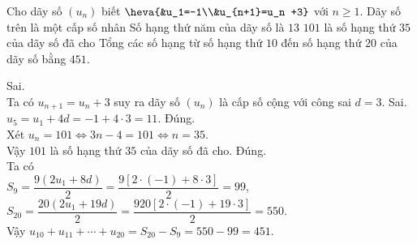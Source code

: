 \begin{ex}%
Cho dãy số $(u_n)$ biết $\heva{&u_1=-1\\&u_{n+1}=u_n +3}$ với $n \ge 1$.
	\choiceTF
	{Dãy số trên là một cấp số nhân}
	{Số hạng thứ năm của dãy số là $13$}
	{\True $101$ là số hạng thứ $35$ của dãy số đã cho}
	{\True Tổng các số hạng từ số hạng thứ $10$ đến số hạng thứ $20$ của dãy số bằng $451$.}
	\loigiai
	{
		\begin{itemchoice}
			\itemch Sai. \\
			Ta có $u_{n+1}=u_n +3$ suy ra dãy số $(u_n)$ là cấp số cộng với công sai $d=3$.
			\itemch Sai. \\
			$u_5 = u_1 +4d=-1+ 4 \cdot 3 =11$. 
			\itemch Đúng. \\
			Xét $u_n=101 \Leftrightarrow 3n-4=101 \Leftrightarrow n=35$.\\
			Vậy $101$ là số hạng thứ $35$ của dãy số đã cho.
			\itemch Đúng. \\
			Ta có \\
			$S_9 = \dfrac{9(2u_1+8d)}{2} = \dfrac{9[2\cdot (-1)+8 \cdot 3]}{2} =99$,\\
			$S_{20} = \dfrac{20(2u_1+19d)}{2} = \dfrac{920[2\cdot (-1)+19 \cdot 3]}{2} =550$. \\
			Vậy $u_{10}+u_{11}+ \cdots + u_{20} = S_{20} - S_9 =550-99=451$.
		\end{itemchoice}
	}
\end{ex}

